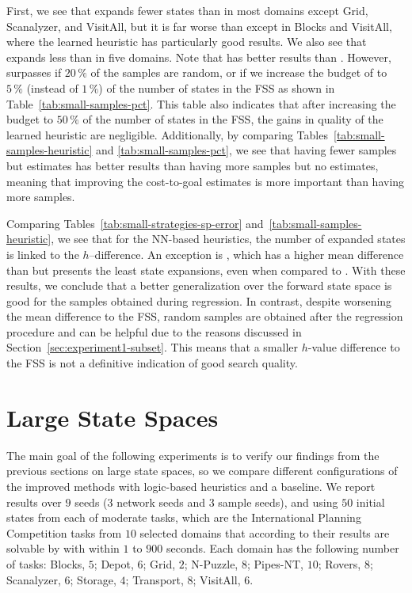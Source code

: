 First, we see that \hnnbase expands fewer states than \hgc in most domains except Grid, Scanalyzer, and VisitAll, but it is far worse than \hff except in Blocks and VisitAll, where the learned heuristic has particularly good results. We also see that \hnnbfsrwl{\meanfx} expands less than \hnnbase in five domains. Note that \hff has better results than \hnnbfsrwl{\meanfx}. However, \hnnbfsrwl{\meanfx} surpasses \hff if $20\,\%$ of the samples are random, or if we increase the budget of \hnnbfsrwl{\meanfx} to $5\,\%$ (instead of $1\,\%$) of the number of states in the FSS as shown in Table~\ref{tab:small-samples-pct}. This table also indicates that after increasing the budget to $50\,\%$ of the number of states in the FSS, the gains in quality of the learned heuristic are negligible. Additionally, by comparing Tables~\ref{tab:small-samples-heuristic} and \ref{tab:small-samples-pct}, we see that having fewer samples but \hstar estimates has better results than having more samples but no \hstar estimates, meaning that improving the cost-to-goal estimates is more important than having more samples.

Comparing Tables~\ref{tab:small-strategies-sp-error} and~\ref{tab:small-samples-heuristic}, we see that for the NN-based heuristics, the number of expanded states is linked to the $h$--\hstar difference. An exception is \hnnrs, which has a higher mean difference than \hnnbfsrwl{\meanfx} but presents the least state expansions, even when compared to \hff. With these results, we conclude that a better generalization over the forward state space is good for the samples obtained during regression. In contrast, despite worsening the mean difference to the FSS, random samples are obtained after the regression procedure and can be helpful due to the reasons discussed in Section~\ref{sec:experiment1-subset}. This means that a smaller $h$-value difference to the FSS is not a definitive indication of good search quality.

\section{Large State Spaces}
\label{sec:experiment2}

The main goal of the following experiments is to verify our findings from the previous sections on large state spaces, so we compare different configurations of the improved methods with logic-based heuristics and a baseline. We report results over $9$ seeds ($3$ network seeds and $3$ sample seeds), and using $50$ initial states from each of \citeyear{Ferber.etal/2022} moderate tasks, which are the International Planning Competition tasks from $10$ selected domains that according to their results are solvable by \gbfs with \hff within $1$ to $900$ seconds. Each domain has the following number of tasks: Blocks, $5$; Depot, $6$; Grid, $2$; N-Puzzle, $8$; Pipes-NT, $10$; Rovers, $8$; Scanalyzer, $6$; Storage, $4$; Transport, $8$; VisitAll, $6$.

